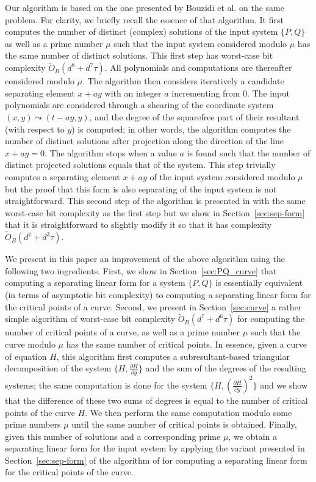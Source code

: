 \documentclass{sig-alternate}
\newcommand{\sOB}{\ensuremath{\widetilde{{O}}_B}}
\newcommand{\blue}[1]{\color{blue}#1\color{black}\xspace}
\renewcommand{\blue}[1]{#1\xspace}
\begin{document}
Our algorithm is based on the one presented by Bouzidi et
al.  \blue{\cite{bouzidiJSC2014a}} on the same problem. For clarity, we briefly
recall the essence of that algorithm. It  first computes the number of distinct (complex) solutions of the input system $\{P,Q\}$ as well as a
prime number $\mu$ such that the input system considered modulo $\mu$ has the same number of
distinct solutions. This first step has worst-case bit complexity $\sOB(d^8+d^7\tau)$. 
All polynomials and computations are thereafter considered modulo
$\mu$. The algorithm then considers iteratively
a candidate separating element $x+ay$ with an integer $a$  incrementing  from 0. 
The input polynomials are considered through a  \blue{shearing} of
the coordinate system $(x,y)\leadsto(t-ay,y)$, and the degree of the squarefree
part of their resultant (with respect to $y$) is computed; 
in other words, the algorithm computes the number of
distinct solutions after  projection along the direction of the line $x+ay=0$. The algorithm stops
when a value $a$ is found such that the number of distinct projected solutions equals that of the
system. This step trivially computes a separating element $x+ay$ of the input system considered modulo
$\mu$ but the proof that this form is also separating of the  input system is not straightforward. 
This second step of the algorithm is presented in \blue{\cite{bouzidiJSC2014a}} with the same 
worst-case bit complexity as the first step  but we show \blue{in Section~\ref{sec:sep-form}} that it is straightforward to slightly  modify it so
that it has complexity \blue{$\sOB(d^7+d^3\tau)$.}

We present in this paper an improvement of the above algorithm using the following two
ingredients. First, we
show \blue{in Section~\ref{sec:PQ_curve}}  that computing a separating linear form for a system $\{P,Q\}$ is essentially equivalent (in terms of
asymptotic bit complexity) to computing a separating linear form for the critical points of a curve.
Second, 
we present \blue{in Section~\ref{sec:curve}}  a rather simple algorithm of worst-case bit complexity $\sOB(d^7+d^6\tau)$ for computing the number of critical points of a
curve, as well as a prime number $\mu$ such that the curve modulo $\mu$ has the same number of
 critical points. In essence, given a curve of equation $H$, this algorithm first computes a subresultant-based
triangular decomposition \cite{VegKah:curve2d:96} of the
system $\{H,\frac{\partial H}{\partial y}\}$ and the sum of the degrees of the resulting systems; the same
computation is done for the system $\{H,(\frac{\partial H}{\partial y})^2\}$ and we show that the
difference of these two sums of degrees is equal to the number of critical points of the 
curve $H$. We then perform the same computation modulo some prime numbers $\mu$ until the same
number of critical points is obtained. Finally, given this number of solutions and a
corresponding prime $\mu$, we obtain a separating linear form for the input system by  applying  the
\blue{variant presented in Section~\ref{sec:sep-form} of the} algorithm of 
\blue{\cite{bouzidiJSC2014a}} for computing a separating linear form for the critical points of the
curve.
\end{document}
